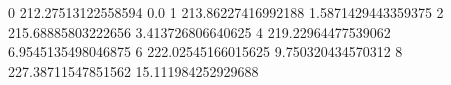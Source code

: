 0 212.27513122558594 0.0
1 213.86227416992188 1.5871429443359375
2 215.68885803222656 3.413726806640625
4 219.22964477539062 6.9545135498046875
6 222.02545166015625 9.750320434570312
8 227.38711547851562 15.111984252929688

